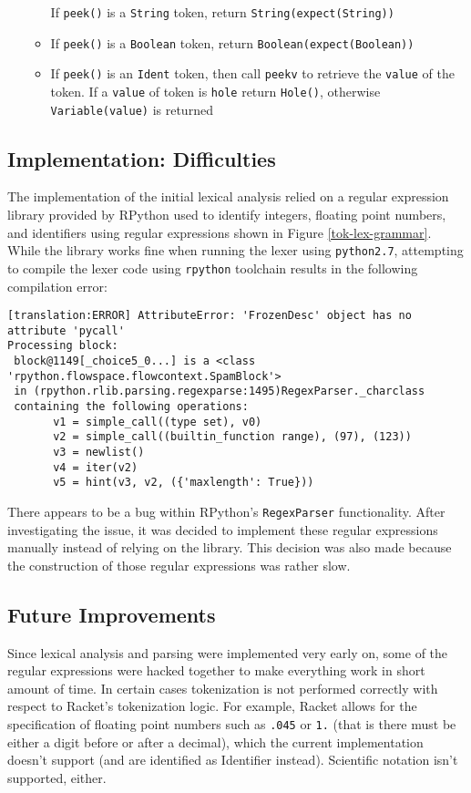 \begin{itemize}
\begin{itemize}
		If \texttt{peek()} is a \texttt{String} token, return \texttt{String(expect(String))}
	\item
		If \texttt{peek()} is a \texttt{Boolean} token, return \texttt{Boolean(expect(Boolean))}
	\item

		If \texttt{peek()} is an \texttt{Ident} token, then call \texttt{peekv} to retrieve the \texttt{value} of the token. If a \texttt{value} of token is \texttt{hole} return \texttt{Hole()}, otherwise \texttt{Variable(value)} is returned
	\end{itemize}
	

\end{itemize}

\subsection{Implementation: Difficulties}
The implementation of the initial lexical analysis relied on a regular expression library provided by RPython used to identify integers, floating point numbers, and identifiers using regular expressions shown in Figure \ref{tok-lex-grammar}. While the library works fine when running the lexer using \texttt{python2.7}, attempting to compile the lexer code using \texttt{rpython} toolchain results in the following compilation error:

\begin{verbatim}
[translation:ERROR] AttributeError: 'FrozenDesc' object has no attribute 'pycall'
Processing block:
 block@1149[_choice5_0...] is a <class 'rpython.flowspace.flowcontext.SpamBlock'> 
 in (rpython.rlib.parsing.regexparse:1495)RegexParser._charclass 
 containing the following operations: 
       v1 = simple_call((type set), v0) 
       v2 = simple_call((builtin_function range), (97), (123)) 
       v3 = newlist() 
       v4 = iter(v2) 
       v5 = hint(v3, v2, ({'maxlength': True})) 
\end{verbatim}

There appears to be a bug within RPython's \texttt{RegexParser} functionality. After investigating the issue, it was decided to implement these regular expressions manually instead of relying on the library. This decision was also made because the construction of those regular expressions was rather slow.

\subsection{Future Improvements}

Since lexical analysis and parsing were implemented very early on, some of the regular expressions were hacked together to make everything work in short amount of time. In certain cases tokenization is not performed correctly with respect to Racket's tokenization logic. For example, Racket allows for the specification of floating point numbers such as \texttt{.045} or \texttt{1.} (that is there must be either a digit before or after a decimal), which the current implementation doesn't support (and are identified as Identifier instead). Scientific notation isn't supported, either.
